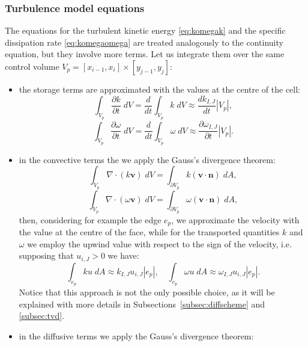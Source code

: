 \subsubsection{Turbulence model equations}
The equations for the turbulent kinetic energy \eqref{eq:komegak} and the 
specific dissipation rate \eqref{eq:komegaomega} are treated analogously to the 
continuity equation, but they involve more terms. Let us integrate them over 
the same control volume  $V_p = [x_{i-1},x_i] \times [y_{j-1},y_j]$:
\begin{itemize}
	\item the storage terms are approximated with the values at the centre of 
	the cell:
	\begin{equation}
	\int_{V_p} \frac{\partial k}{\partial t} \; dV = \frac{d}{dt} \int_{V_p}k 
	\; dV \approx \frac{dk_{I,J}}{dt}|V_p|,
	\end{equation}
	\begin{equation}
	\int_{V_p} \frac{\partial 
	\omega}{\partial t} \; dV = \frac{d}{dt} \int_{V_p} \omega \; dV \approx 
	\frac{\partial \omega_{I,J}}{\partial t}|V_p|.
	\end{equation}
	\item in the convective terms the we apply the Gauss's divergence theorem:
	\begin{equation}
		\int_{V_p} \nabla \cdot (k \mathbf{v}) \; dV = \int_{\partial V_p} k 
		(\mathbf{v} 
		\cdot \mathbf{n}) \; dA,
	\end{equation}
	\begin{equation}
	\int_{V_p} \nabla \cdot (\omega \mathbf{v}) \; dV = \int_{\partial V_p} 
	\omega 
	(\mathbf{v} \cdot \mathbf{n}) \; dA,
	\end{equation}
	then, considering for example the edge $e_p$, we approximate the velocity 
	with the value at the centre of the face, while for the transported 
	quantities $k$ and $\omega$ we employ the upwind value with respect to the 
	sign of the velocity, i.e. supposing that $u_{i,J}>0$ we have:
	\begin{equation}
		\int_{e_p} ku \; dA \approx k_{I,J}u_{i,J}|e_p|, \quad \int_{e_p} 
		\omega u \; dA \approx \omega_{I,J}u_{i,J}|e_p|.
	\end{equation}
	Notice that this approach is not the only possible choice, as it will be 
	explained with more details in Subsections~\ref{subsec:diffscheme} and 
	\ref{subsec:tvd}.
	\item in the diffusive terms we apply the Gauss's divergence theorem:
	\begin{equation}

\end{equation}
\end{itemize}
